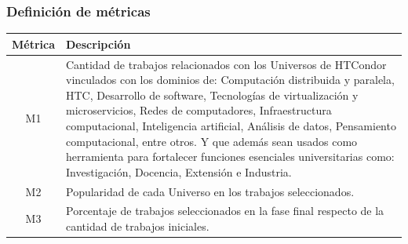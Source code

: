 \subsubsection{Definición de métricas}
\begin{table}[H]
	\centering
	\renewcommand{\arraystretch}{1.2} %
	\fontsize{9pt}{10pt}\selectfont %
	\begin{tabular}{|c|p{13cm}|} %
		\hline
		\textbf{Métrica} & \textbf{Descripción}                                                                                                                                                                                                                                                                                                                                                                                                                                                                                           \\ \hline
		M1               & Cantidad de trabajos relacionados con los Universos de HTCondor vinculados con los dominios de: Computación distribuida y paralela, HTC, Desarrollo de software, Tecnologías de virtualización y microservicios, Redes de computadores, Infraestructura computacional, Inteligencia artificial, Análisis de datos, Pensamiento computacional, entre otros. Y que además sean usados como herramienta para fortalecer funciones esenciales universitarias como: Investigación, Docencia, Extensión e Industria. \\ \hline
		M2               & Popularidad de cada Universo en los trabajos seleccionados.                                                                                                                                                                                                                                                                                                                                                                                                                                                    \\ \hline
		M3               & Porcentaje de trabajos seleccionados en la fase final respecto de la cantidad de trabajos iniciales.                                                                                                                                                                                                                                                                                                                                                                                                           \\ \hline

\end{tabular}
\end{table}
